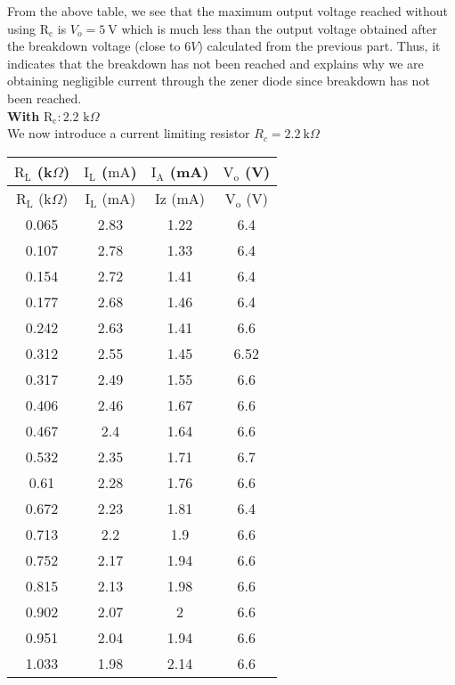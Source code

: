 \documentclass[12pt]{article}
\begin{document}
\noindent
From the above table, we see that the maximum output voltage reached without using $\mathrm{R_c}$ is $V_o = 5 \ \mathrm{V}$ which is much less than the output voltage obtained after the breakdown voltage (close to $6V $) calculated from the previous part. Thus, it indicates that the breakdown has not been reached and explains why we are obtaining negligible current through the zener diode since breakdown has not been reached. \\[0.3cm]
\textbf{With} $\mathrm{R_c}: 2.2$ $\mathrm{k}\Omega$\\[0.3cm]
We now introduce a current limiting resistor $R_c = 2.2 \ \mathrm{k}\Omega$
\begin{longtable}{|c|c|c|c|} 
        \hline 
        $\text{R}_\text{L}$ (k$\Omega$) & {$\text{I}_\text{L}$ ($\mathrm{mA}$)} & $\text{I}_\text{A}$ (mA) & $\text{V}_\text{o}$ (V) \\ \hline \hline
        \endfirsthead
        \hline 
        {$\text{R}_\text{L}$ (k$\Omega$)} & {$\text{I}_\text{L}$ ($\mathrm{mA}$)} & {Iz ($\mathrm{mA}$)} & {$\mathrm{V_o}$ ($\mathrm{V}$)} \\ \hline \hline
        \endhead
        
        \hline
        \endfoot
        
        \hline
        \endlastfoot
        
        0.065       & 2.83      & 1.22    & 6.4     \\ \hline
        0.107       & 2.78      & 1.33    & 6.4     \\ \hline
        0.154       & 2.72      & 1.41    & 6.4     \\ \hline
        0.177       & 2.68      & 1.46    & 6.4     \\ \hline
        0.242       & 2.63      & 1.41    & 6.6     \\ \hline
        0.312       & 2.55      & 1.45    & 6.52    \\ \hline
        0.317       & 2.49      & 1.55    & 6.6     \\ \hline
        0.406       & 2.46      & 1.67    & 6.6     \\ \hline
        0.467       & 2.4       & 1.64    & 6.6     \\ \hline
        0.532       & 2.35      & 1.71    & 6.7     \\ \hline
        0.61        & 2.28      & 1.76    & 6.6     \\ \hline
        0.672       & 2.23      & 1.81    & 6.4     \\ \hline
        0.713       & 2.2       & 1.9     & 6.6     \\ \hline
        0.752       & 2.17      & 1.94    & 6.6     \\ \hline
        0.815       & 2.13      & 1.98    & 6.6     \\ \hline
        0.902       & 2.07      & 2       & 6.6     \\ \hline
        0.951       & 2.04      & 1.94    & 6.6     \\ \hline
        1.033       & 1.98      & 2.14    & 6.6     \\ \hline
        
    \end{longtable}
    
\end{document}
